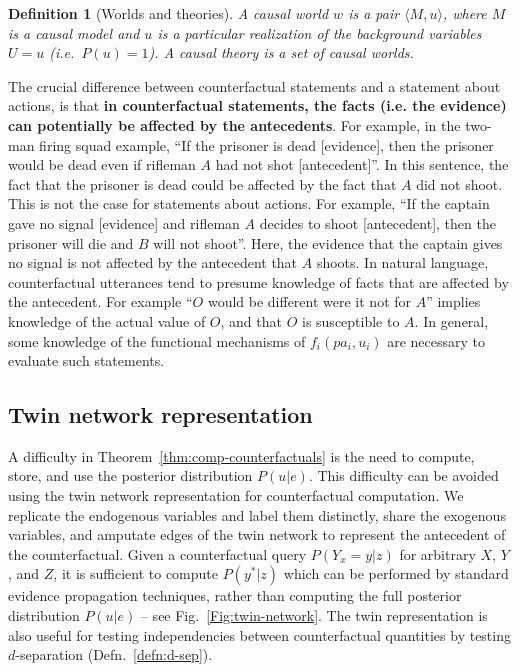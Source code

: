 \documentclass[11pt]{article}
\numberwithin{equation}{section}
\newtheorem{defn}{Definition}[section]
\begin{document}
\begin{defn}[Worlds and theories]
A causal world $w$ is a pair $\langle M,u \rangle$, where $M$ is a causal model and $u$ is a particular realization of the background variables $U=u$ (i.e.\ $P(u)=1$). A causal theory is a set of causal worlds.
\end{defn}

The crucial difference between counterfactual statements and a statement about actions, is that \textbf{in counterfactual statements, the facts (i.e. the evidence) can potentially be affected by the antecedents}. For example, in the two-man firing squad example, ``If the prisoner is dead [evidence], then the prisoner would be dead even if rifleman $A$ had not shot [antecedent]''. In this sentence, the fact that the prisoner is dead could be affected by the fact that $A$ did not shoot. This is not the case for statements about actions. For example, ``If the captain gave no signal [evidence] and rifleman $A$ decides to shoot [antecedent], then the prisoner will die and $B$ will not shoot''. Here, the evidence that the captain gives no signal is not affected by the antecedent that $A$ shoots. In natural language, counterfactual utterances tend to presume knowledge of facts that are affected by the antecedent. For example ``$O$ would be different were it not for $A$'' implies knowledge of the actual value of $O$, and that $O$ is susceptible to $A$. In general, some knowledge of the functional mechanisms of $f_i(pa_i, u_i)$ are necessary to evaluate such statements.

\subsection{Twin network representation}
A difficulty in Theorem~\ref{thm:comp-counterfactuals} is the need to compute, store, and use the posterior distribution $P(u|e)$. This difficulty can be avoided using the twin network representation for counterfactual computation. We replicate the endogenous variables and label them distinctly, share the exogenous variables, and amputate edges of the twin network to represent the antecedent of the counterfactual. Given a counterfactual query $P(Y_x=y|z)$ for arbitrary $X$, $Y$, and $Z$, it is sufficient to compute $P(y^*|z)$ which can be performed by standard evidence propagation techniques, rather than computing the full posterior distribution $P(u|e)$ -- see Fig.~\ref{Fig:twin-network}. The twin representation is also useful for testing independencies between counterfactual quantities by testing $d$-separation (Defn.~\ref{defn:d-sep}).
\end{document}
